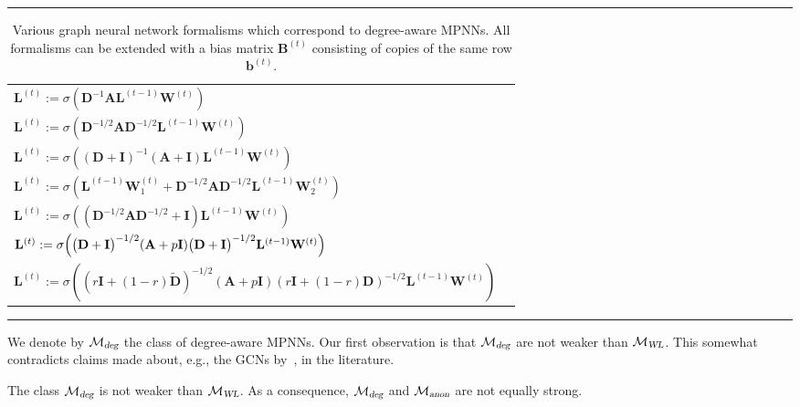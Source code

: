 \begin{table}[]
\hrule
\hspace*{1ex}
 \caption{Various graph neural network formalisms which correspond to degree-aware MPNNs. All formalisms can be extended with a bias matrix $\mathbf{B}^{(t)}$ consisting of copies of the same row $\mathbf{b}^{(t)}$.}
    \label{tab:dMPNNs}
    \centering
    \begin{tabular}{ll}
 $\mathbf{L}^{(t)}:=\sigma\left(\mathbf{D}^{-1}\mathbf{A}\mathbf{L}^{(t-1)}\mathbf{W}^{(t)}\right)$ &\cite{} \\
$
\mathbf{L}^{(t)}:=\sigma\left(\mathbf{D}^{-1/2}\mathbf{A}\mathbf{D}^{-1/2}\mathbf{L}^{(t-1)}\mathbf{W}^{(t)}\right)$&\cite{} \\
$
\mathbf{L}^{(t)}:=\sigma\left((\mathbf{D}+\mathbf{I})^{-1}(\mathbf{A}+\mathbf{I})\mathbf{L}^{(t-1)}\mathbf{W}^{(t)}\right)$&\cite{} \\
$\mathbf{L}^{(t)}:=\sigma\left(\mathbf{L}^{(t-1)}\mathbf{W}_1^{(t)}+\mathbf{D}^{-1/2}\mathbf{A}\mathbf{D}^{-1/2}\mathbf{L}^{(t-1)}\mathbf{W}_2^{(t)}\right)$&\cite{} \\
$
\mathbf{L}^{(t)}:=\sigma\left((\mathbf{D}^{-1/2}\mathbf{A}\mathbf{D}^{-1/2}+\mathbf{I})\mathbf{L}^{(t-1)}\mathbf{W}^{(t)}\right)$ &\cite{} \\
$
\mathbf{L}^{(t)}:=\sigma\Bigl(\bigl(\mathbf{D}+\mathbf{I}\bigr)^{-1/2} (\mathbf{A}+p\mathbf{I})\bigl(\mathbf{D}+\mathbf{I}\bigr)^{-1/2} \mathbf{L}^{(t-1)}\mathbf{W}^{(t)}\Bigr)
$& \cite{kipf-loose} \\
$\mathbf{L}^{(t)}:=\sigma\left((r\mathbf{I}+(1-r)\tilde{\mathbf{D}})^{-1/2}(\mathbf{A}+p\mathbf{I})(r\mathbf{I}+(1-r)\mathbf{D})^{-1/2}\mathbf{L}^{(t-1)}\mathbf{W}^{(t)}\right)$ & \cite{DBLP:journals/corr/abs-1905-03046} 
    \end{tabular}
\hspace*{1ex}
\hrule
\end{table}
We denote by $\mathcal{M}_{\textsl{deg}}$ the class of degree-aware MPNNs. Our first observation is that
$\mathcal{M}_{\textsl{deg}}$ are not weaker than $\mathcal{M}_{\textsl{WL}}$. This somewhat contradicts claims made about, e.g., the GCNs by~\cite{kipf-loose}, in the literature.
\begin{proposition}
The class $\mathcal{M}_{\textsl{deg}}$ is not weaker than $\mathcal{M}_{\textsl{WL}}$. As a consequence,  $\mathcal{M}_{\textsl{deg}}$ and  $\mathcal{M}_{\textsl{anon}}$ are not equally strong.
\end{proposition}
